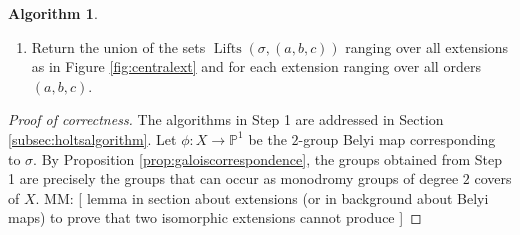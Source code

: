 \documentclass{dcthesis}
\newcommand{\PP}{\mathbb P}
\newcommand{\ZZ}{\mathbb Z}
\newcommand{\mm}[1]{{\color{blue} \sf MM: [#1]}}
\newcommand{\wt}[1]{\widetilde{#1}}
\DeclareMathOperator{\Lifts}{Lifts}
\DeclareMathOperator{\order}{order}
\theoremstyle{definition}
\newtheorem{alg}[prop]{Algorithm}
\theoremstyle{remark}
\numberwithin{equation}{section}
\numberwithin{figure}{section}
\begin{document}
{{\begin{alg}
\begin{enumerate}
\begin{enumerate}
\begin{equation}
                  \wt{\sigma}\colonequals(\wt{\sigma}_0, \wt{\sigma}_1, \wt{\sigma}_\infty) :
                  \wt{\sigma}_s\in\pi^{-1}(\sigma_s)\text{ for }
                  s\in\{0,1,\infty\}
                \}
              \end{equation}
              and let $\Lifts(\sigma)$ denote the set of such $\wt{\sigma}$
              with the property that $\wt{\sigma}_\infty\wt{\sigma}_1\wt{\sigma}_0 = 1$
              and $\langle\wt{\sigma}\rangle = \wt{G}$.
            \item
              For each $\wt{\sigma}\in\Lifts(\sigma)$ compute
              $\order(\wt{\sigma})\colonequals(\order(\wt{\sigma}_0), \order(\wt{\sigma}_1), \order(\wt{\sigma}_\infty))\in\ZZ^3$
              and sort $\Lifts(\sigma)$ according to $\order(\wt{\sigma})$.
              Let
              \begin{equation}
                \label{eqn:liftsorders}
                \Lifts(\sigma,(a,b,c))\colonequals
                \{
                  \wt{\sigma}\in\Lifts(\sigma) :
                  \order(\wt{\sigma}) = (a,b,c)
                \}.
              \end{equation}
            \item
              For each set of triples $\Lifts(\sigma,(a,b,c))$
              remove simultaneously conjugate triples so that
              $\Lifts(\sigma,(a,b,c))$ has exactly one representative
              from each simultaneous conjugacy class.
              \mm{TODO: reword}
          \end{enumerate}
        \item
          Return the union of the sets $\Lifts(\sigma,(a,b,c))$
          ranging over all extensions as in Figure
          \ref{fig:centralext}
          and for each extension ranging over all orders
          $(a,b,c)$.
      \end{enumerate}
    \end{alg}
    \begin{proof}[Proof of correctness]
      The algorithms in Step 1 are addressed in Section \ref{subsec:holtsalgorithm}.
      Let $\phi:X\to\PP^1$ be the $2$-group Belyi map corresponding to $\sigma$.
      By Proposition \ref{prop:galoiscorrespondence},
      the groups obtained from Step 1 are precisely the
      groups that can occur as monodromy groups of degree $2$ covers of $X$.
      \mm{
        lemma in section about extensions
        (or in background about Belyi maps)
        to prove
        that two isomorphic extensions cannot produce
}
\end{proof}}}
\end{document}

